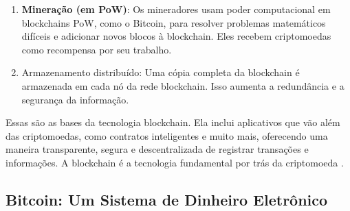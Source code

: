 \documentclass[a4paper,12pt]{article}
\newcommand{\printingbibliography}{%

    \pagestyle{myheadings}
    \markright{}
    \sloppy
    \printbibliography[heading=bibintoc, %
                   title=Refer\^encias %
                  ]
    \fussy%
}
\begin{document}
\begin{enumerate}
     \item \textbf{Mineração (em PoW)}: Os mineradores usam poder computacional em blockchains PoW, 
     como o Bitcoin, para resolver problemas matemáticos difíceis e adicionar novos blocos à blockchain. 
     Eles recebem criptomoedas como recompensa por seu trabalho.

     \item Armazenamento distribuído: Uma cópia completa da blockchain é armazenada em cada nó da rede blockchain. 
     Isso aumenta a redundância e a segurança da informação.
\end{enumerate}

Essas são as bases da tecnologia blockchain. Ela inclui aplicativos que vão além das criptomoedas, como 
contratos inteligentes e muito mais, oferecendo uma maneira transparente, segura e descentralizada de registrar 
transações e informações. A blockchain é a tecnologia fundamental por trás da criptomoeda \btc. 


\subsection{Bitcoin: Um Sistema de Dinheiro Eletrônico}


\hspace{0.5cm}
\printingbibliography
\end{document}
